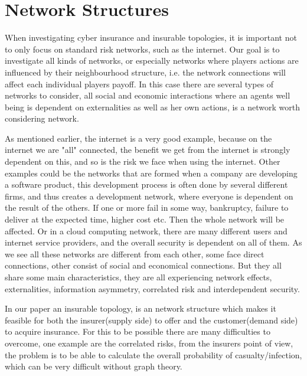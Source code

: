 \section{Network Structures}
When investigating cyber insurance and insurable topologies, it is important not to only focus on standard risk networks, such as the internet. Our goal is to investigate all kinds of networks, or especially networks where players actions are influenced by their neighbourhood structure, i.e. the network connections will affect each individual players payoff. 
In this case there are several types of networks to consider, all social and economic interactions where an agents well being is dependent on externalities as well as her own actions, is a network worth considering network.

As mentioned earlier, the internet is a very good example, because on the internet we are "all" connected, the benefit we get from the internet is strongly dependent on this, and so is the risk we face when using the internet. 
Other examples could be the networks that are formed when a company are developing a software product, this development process is often done by several different firms, and thus creates a development network, where everyone is dependent on the result of the others. 
If one or more fail in some way, bankruptcy, failure to deliver at the expected time, higher cost etc. 
Then the whole network will be affected. 
Or in a cloud computing network, there are many different users and internet service providers, and the overall security is dependent on all of them. 
As we see all these networks are different from each other, some face direct connections, other consist of social and economical connections. But they all share some main characteristics, they are all experiencing network effects, externalities, information asymmetry, correlated risk and interdependent security. \cite{networkgames}

In our paper an insurable topology, is an network structure which makes it feasible for both the
 insurer(supply side)  to offer and the customer(demand side) to acquire insurance.
 For this to be possible there are many  difficulties to overcome,  one example are the correlated risks, from the insurers point of view, the problem is to be able to calculate the overall probability of casualty/infection, which can be very difficult without graph theory. 

